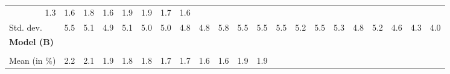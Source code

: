 \begin{tabular}{lllllllllllllllllllll}
  \multicolumn{1}{r}{1.3} &
  \multicolumn{1}{r}{1.6} &
  \multicolumn{1}{r}{1.8} &
  \multicolumn{1}{r}{1.6} &
  \multicolumn{1}{r}{1.9} &
  \multicolumn{1}{r}{1.9} &
  \multicolumn{1}{r}{1.7} &
  \multicolumn{1}{r}{1.6} \\
\multicolumn{1}{l}{\hspace{2em}Std. dev.} &
  \multicolumn{1}{|r}{5.5} &
  \multicolumn{1}{r}{5.1} &
  \multicolumn{1}{r}{4.9} &
  \multicolumn{1}{r}{5.1} &
  \multicolumn{1}{r}{5.0} &
  \multicolumn{1}{r}{5.0} &
  \multicolumn{1}{r}{4.8} &
  \multicolumn{1}{r}{4.8} &
  \multicolumn{1}{r}{5.8} &
  \multicolumn{1}{r}{5.5} &
  \multicolumn{1}{r}{5.5} &
  \multicolumn{1}{r}{5.5} &
  \multicolumn{1}{r}{5.2} &
  \multicolumn{1}{r}{5.5} &
  \multicolumn{1}{r}{5.3} &
  \multicolumn{1}{r}{4.8} &
  \multicolumn{1}{r}{5.2} &
  \multicolumn{1}{r}{4.6} &
  \multicolumn{1}{r}{4.3} &
  \multicolumn{1}{r}{4.0} \\ \hline
\multicolumn{1}{l}{{\textbf{Model (B)}}} &
  \multicolumn{1}{|r}{} &
  \multicolumn{1}{r}{} &
  \multicolumn{1}{r}{} &
  \multicolumn{1}{r}{} &
  \multicolumn{1}{r}{} &
  \multicolumn{1}{r}{} &
  \multicolumn{1}{r}{} &
  \multicolumn{1}{r}{} &
  \multicolumn{1}{r}{} &
  \multicolumn{1}{r}{} &
  \multicolumn{1}{r}{} &
  \multicolumn{1}{r}{} &
  \multicolumn{1}{r}{} &
  \multicolumn{1}{r}{} &
  \multicolumn{1}{r}{} &
  \multicolumn{1}{r}{} &
  \multicolumn{1}{r}{} &
  \multicolumn{1}{r}{} &
  \multicolumn{1}{r}{} &
  \multicolumn{1}{r}{} \\ \hline
\multicolumn{1}{l}{\hspace{1em}{\textit{Multiplicative term} ($\widehat{\tau}^{adv}-1$)}} &
  \multicolumn{1}{|r}{} &
  \multicolumn{1}{r}{} &
  \multicolumn{1}{r}{} &
  \multicolumn{1}{r}{} &
  \multicolumn{1}{r}{} &
  \multicolumn{1}{r}{} &
  \multicolumn{1}{r}{} &
  \multicolumn{1}{r}{} &
  \multicolumn{1}{r}{} &
  \multicolumn{1}{r}{} &
  \multicolumn{1}{r}{} &
  \multicolumn{1}{r}{} &
  \multicolumn{1}{r}{} &
  \multicolumn{1}{r}{} &
  \multicolumn{1}{r}{} &
  \multicolumn{1}{r}{} &
  \multicolumn{1}{r}{} &
  \multicolumn{1}{r}{} &
  \multicolumn{1}{r}{} &
  \multicolumn{1}{r}{} \\
\multicolumn{1}{l}{\hspace{2em}Mean (in $\%$)} &
  \multicolumn{1}{|r}{2.2} &
  \multicolumn{1}{r}{2.1} &
  \multicolumn{1}{r}{1.9} &
  \multicolumn{1}{r}{1.8} &
  \multicolumn{1}{r}{1.8} &
  \multicolumn{1}{r}{1.7} &
  \multicolumn{1}{r}{1.7} &
  \multicolumn{1}{r}{1.6} &
  \multicolumn{1}{r}{1.6} &
  \multicolumn{1}{r}{1.9} &
  \multicolumn{1}{r}{1.9} &

\end{tabular}
